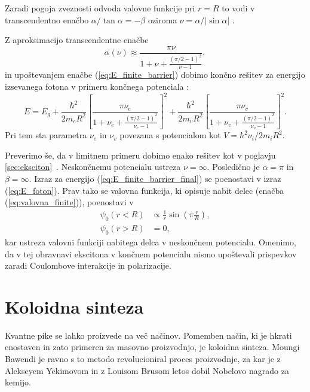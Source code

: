 \documentclass[twoside,11pt]{article}
\begin{document}
Zaradi pogoja zveznosti odvoda valovne funkcije pri $r=R$ to vodi v transcendentno enačbo $\alpha / \tan \alpha = - \beta$ oziroma $\nu = \alpha / |\sin \alpha|$ \cite{LEYRONAS2001631}.

Z aproksimacijo transcendentne enačbe
\begin{equation}
   \alpha(\nu) \approx \frac{\pi \nu}{1 + \nu + \frac{(\pi/2-1)^2}{\nu-1}},
\end{equation}  
in upoštevanjem enačbe (\ref{eq:E_finite_barrier}) dobimo končno rešitev za energijo izsevanega fotona v primeru končnega potenciala \cite{Ferreira_2017}:
\begin{equation}
   \label{eq:E_finite_barrier_final}
   E = E_g + \frac{\hbar^2}{2m_eR^2}\left[\frac{\pi \nu_e}{1 + \nu_e + \frac{(\pi/2-1)^2}{\nu_e-1}}\right]^2 + \frac{\hbar^2}{2m_vR^2}\left[\frac{\pi \nu_v}{1 + \nu_v + \frac{(\pi/2-1)^2}{\nu_v-1}}\right]^2.
\end{equation} 
Pri tem sta parametra $\nu_e$ in $\nu_v$ povezana s potencialom kot $V = \hbar^2 \nu_i / 2m_iR^2$. 

Preverimo še, da v limitnem primeru dobimo enako rešitev kot v poglavju \ref{sec:eksciton} \,. Neskončnemu potencialu ustreza $\nu = \infty$. Posledično je $\alpha = \pi$ in $\beta = \infty$.
Izraz za energijo (\ref{eq:E_finite_barrier_final}) se poenostavi v izraz (\ref{eq:E_foton}). Prav tako se valovna funkcija, ki opisuje nabit delec (enačba (\ref{eq:valovna_finite})), poenostavi v
\begin{equation}
   \begin{split}
      \psi_0(r < R) &\propto \frac{1}{r} \sin \left(\pi \frac{r}{R}\right),\\
      \psi_0(r > R) &= 0,
   \end{split}
\end{equation}
kar ustreza valovni funkciji nabitega delca v neskončnem potencialu. Omenimo, da v tej obravnavi ekscitona v končnem potencialu nismo upoštevali prispevkov zaradi Coulombove interakcije in polarizacije.

\section{Koloidna sinteza}
Kvantne pike se lahko proizvede na več načinov. Pomemben način, ki je hkrati enostaven in zato primeren za masovno proizvodnjo, je
koloidna sinteza. Moungi Bawendi je ravno s to metodo revolucioniral proces proizvodnje, za kar je z Alekseyem Yekimovom in z Louisom Brusom letos dobil Nobelovo nagrado za kemijo.
\end{document}
